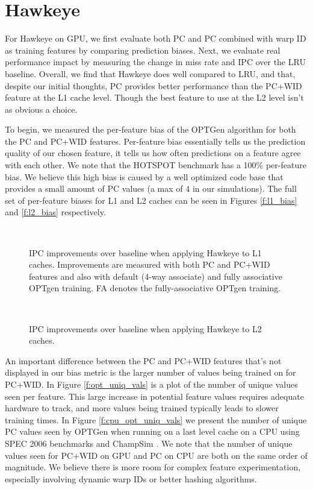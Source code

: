 \section{Hawkeye}
For Hawkeye on GPU, we first evaluate both PC and PC combined with warp ID as training features by comparing prediction biases. Next, we evaluate real performance impact by measuring the change in miss rate and IPC over the LRU baseline. Overall, we find that Hawkeye does well compared to LRU, and that, despite our initial thoughts, PC provides better performance than the PC+WID feature at the L1 cache level. Though the best feature to use at the L2 level isn't as obvious a choice.

To begin, we measured the per-feature bias of the OPTGen algorithm for both the PC and PC+WID features. Per-feature bias essentially tells us the prediction quality of our chosen feature, it tells us how often predictions on a feature agree with each other. We note that the HOTSPOT benchmark has a 100\% per-feature bias. We believe this high bias is caused by a well optimized code base that provides a small amount of PC values (a max of 4 in our simulations). The full set of per-feature biases for L1 and L2 caches can be seen in Figures \ref{f:l1_bias} and \ref{f:l2_bias} respectively.

\begin{figure}[htb]
\begin{center}
\ 
\caption{IPC improvements over baseline when applying Hawkeye to L1 caches. Improvements are measured with both PC and PC+WID features and also with default (4-way associate) and fully associative OPTgen training. FA denotes the fully-associative OPTgen training.}
\label{f:l1_ipc}
\end{center}
\end{figure}

\begin{figure}[htb]
\begin{center}
\ 
\caption{IPC improvements over baseline when applying Hawkeye to L2 caches.}
\label{f:l2_ipc}
\end{center}
\end{figure}

An important difference between the PC and PC+WID features that's not displayed in our bias metric is the larger number of values being trained on for PC+WID. In Figure \ref{f:opt_uniq_vals} is a plot of the number of unique values seen per feature. This large increase in potential feature values requires adequate hardware to track, and more values being trained typically leads to slower training times. In Figure \ref{f:cpu_opt_uniq_vals} we present the number of unique PC values seen by OPTGen when running on a last level cache on a CPU using SPEC 2006 \cite{spec} benchmarks and ChampSim \cite{champsim}. We note that the number of unique values seen for PC+WID on GPU and PC on CPU are both on the same order of magnitude. We believe there is more room for complex feature experimentation, especially involving dynamic warp IDs or better hashing algorithms.

